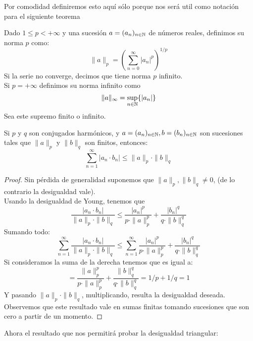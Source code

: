 \documentclass[12pt,a4paper]{book}
\begin{document}
Por comodidad definiremos esto aquí sólo porque nos será util como notación para el siguiente teorema
\begin{defi} Dado $1 \leq p < +\infty$ y una sucesión $a=(a_n)_{n \in \mathbb{N}}$ de números reales, definimos su norma $p$ como:
$$ \| a \|_p = \left( \sum_{n = 0}^{\infty} | a_n |^p \right)^{1/p}$$
Si la serie no converge, decimos que tiene norma $p$ infinito. \\
Si $p = +\infty$ definimos su norma infinito como
$$ \|a\|_\infty = \sup_{{{n} \in \mathbb{N}}}\{ |a_n|\}$$
Sea este supremo finito o infinito.
\end{defi}
\begin{teo}
Si $p$ y $q$ son conjugados harmónicos, y $a=(a_n)_{n \in \mathbb{N}},b=(b_n)_{n \in \mathbb{N}}$ son sucesiones tales que $\|a\|_p$ y $\|b\|_q$ son finitos, entonces:
$$ \sum_{n=1}^{\infty} | a_n \cdot b_n | \leq \| a \|_p \cdot \| b \|_q$$
\begin{proof}
Sin pérdida de generalidad suponemos que $\| a \|_p,\| b \|_q \neq 0$, (de lo contrario la desigualdad vale).\\
Usando la desigualdad de Young, tenemos que 
$$ \frac{|a_n \cdot b_n |}{\| a \|_p \cdot \| b \|_q} \leq \frac{| a_n |^p}{p \cdot \| a \|_p^p} + \frac{|b_n |^q}{q \cdot \| b \|_q^q} $$
Sumando todo:
$$\sum_{n=1}^{\infty} \frac{| a_n \cdot b_n |}{\| a \|_p \cdot \| b \|_q} \leq \sum_{n=1}^{\infty} \frac{| a_n |^p}{p \cdot \| a \|_p^p} + \frac{| b_n |^q}{q \cdot \| b \|_q^q} $$
Si consideramos la suma de la derecha tenemos que es igual a:
$$  = \frac{\| a \|_p^p}{p \cdot \| a \|_p^p} + \frac{\| b \|_q^q}{q \cdot\| b \|_q^q} = 1/p + 1/q = 1 $$
Y pasando $\| a \|_p \cdot \| b \|_q$, multiplicando, resulta la desigualdad deseada.\\
Observemos que este resultado vale en sumas finitas tomando sucesiones que son cero a partir de un momento.
\end{proof}
\end{teo}
Ahora el resultado que nos permitirá probar la desigualdad triangular:
\end{document}
